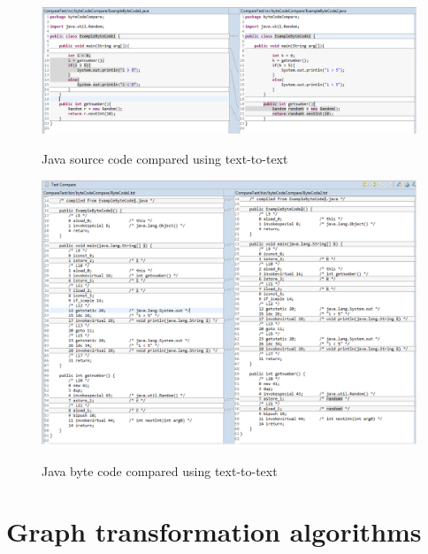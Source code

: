 \documentclass{report}
\begin{document}
\begin{figure}[ht]
  \centering
  \includegraphics[width=1.00\textwidth]{Figures/bytecode-compare/example-of-bytecode-original-compared}\\[0.1cm]
  \caption[Functions compared by members]{Java source code compared using text-to-text}
  \label{fig:example-of-bytecode-original-compared}
\end{figure}


\begin{figure}[h]
  \centering
  \includegraphics[scale = 0.55]{Figures/bytecode-compare/example-of-bytecode-text-compared}\\[0.1cm]
  \caption[Functions compared by members]{Java byte code compared using text-to-text}
  \label{fig:example-of-bytecode-original-compared}
\end{figure}



\chapter{Graph transformation algorithms}
\label{cha:graph-transformation}
\end{document}
